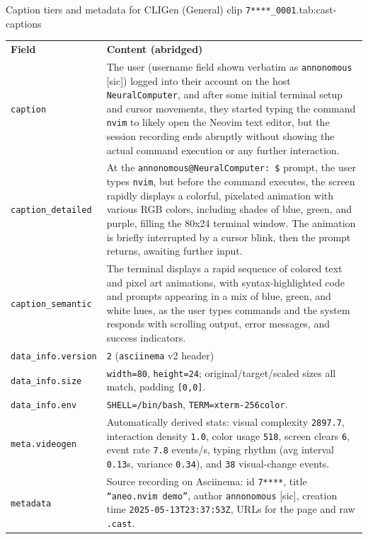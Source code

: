 \begin{smallschemetable}{Caption tiers and metadata for CLIGen (General) clip \texttt{7****\_0001}.}{tab:cast-captions}
  \begin{tabularx}{\linewidth}{@{}l X@{}}
    \toprule
    \rowcolor{tablewarmhead}\textbf{Field} & \textbf{Content (abridged)} \\
    \texttt{caption} &
      The user (username field shown verbatim as \texttt{annonomous} [sic]) logged into their account on the host \texttt{NeuralComputer}, and after some initial terminal setup and cursor movements,
      they started typing the command \texttt{nvim} to likely open the Neovim text editor, but the session recording ends abruptly without showing the actual command execution or any further interaction. \\
    \texttt{caption\_detailed} &
      At the \texttt{annonomous@NeuralComputer:~\$} prompt, the user types \texttt{nvim}, but before the command executes, the screen rapidly displays a colorful,
      pixelated animation with various RGB colors, including shades of blue, green, and purple, filling the 80x24 terminal window.
      The animation is briefly interrupted by a cursor blink, then the prompt returns, awaiting further input. \\
    \texttt{caption\_semantic} &
      The terminal displays a rapid sequence of colored text and pixel art animations, with syntax-highlighted code and prompts appearing in a mix of blue, green,
      and white hues, as the user types commands and the system responds with scrolling output, error messages, and success indicators. \\
    \midrule
    \texttt{data\_info.version} & \texttt{2} (\texttt{asciinema} v2 header) \\
    \texttt{data\_info.size} & \texttt{width=80}, \texttt{height=24}; original/target/scaled sizes all match, padding \texttt{[0,0]}. \\
    \texttt{data\_info.env} & \texttt{SHELL=/bin/bash}, \texttt{TERM=xterm-256color}. \\
    \texttt{meta.videogen} &
      Automatically derived stats: visual complexity \texttt{2897.7}, interaction density \texttt{1.0}, color usage \texttt{518}, screen clears \texttt{6},
      event rate \texttt{7.8} events/s, typing rhythm (avg interval \texttt{0.13}s, variance \texttt{0.34}), and \texttt{38} visual-change events. \\
    \texttt{metadata} &
      Source recording on Asciinema: id \texttt{7****}, title \texttt{``aneo.nvim demo''}, author \texttt{annonomous} [sic], creation time \texttt{2025-05-13T23:37:53Z}, URLs for the page and raw \texttt{.cast}. \\
    \bottomrule
  \end{tabularx}
\end{smallschemetable}

